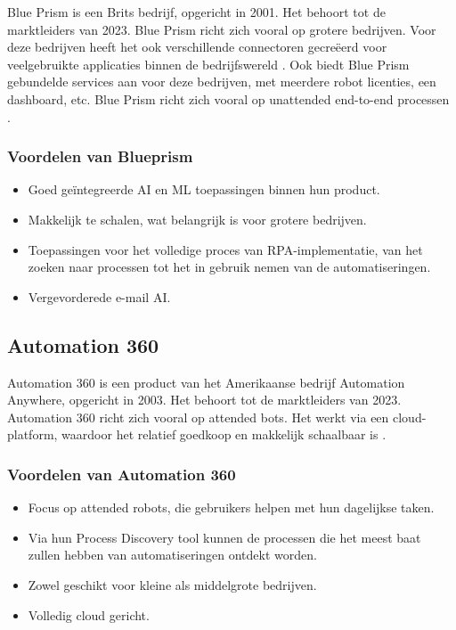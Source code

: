 Blue Prism is een Brits bedrijf, opgericht in 2001. Het behoort tot de marktleiders van 2023. Blue Prism richt zich vooral op grotere bedrijven. Voor deze bedrijven heeft het ook verschillende connectoren gecreëerd voor veelgebruikte applicaties binnen de bedrijfswereld \autocite{GartnerBluePrism2023}. Ook biedt Blue Prism gebundelde services aan voor deze bedrijven, met meerdere robot licenties, een dashboard, etc. Blue Prism richt zich vooral op unattended end-to-end processen \autocite{Laxmikant2023}.

\subsubsection{Voordelen van Blueprism}
\label{subsubsec:voordelen-van-blueprism}

\begin{itemize}
    \item Goed geïntegreerde AI en ML toepassingen binnen hun product.
    \item Makkelijk te schalen, wat belangrijk is voor grotere bedrijven.
    \item Toepassingen voor het volledige proces van RPA-implementatie, van het zoeken naar processen tot het in gebruik nemen van de automatiseringen.
    \item Vergevorderede e-mail AI.
\end{itemize}

\subsection{Automation 360}
\label{subsec:automation-360}

Automation 360 is een product van het Amerikaanse bedrijf Automation Anywhere, opgericht in 2003. Het behoort tot de marktleiders van 2023. Automation 360 richt zich vooral op attended bots. Het werkt via een cloud-platform, waardoor het relatief goedkoop en makkelijk schaalbaar is \autocite{GartnerAutomationAnywhere2023}.

\subsubsection{Voordelen van Automation 360}
\label{subsubsec:voordelen-van-automation-360}

\begin{itemize}
    \item Focus op attended robots, die gebruikers helpen met hun dagelijkse taken.
    \item Via hun Process Discovery tool kunnen de processen die het meest baat zullen hebben van automatiseringen ontdekt worden.
    \item Zowel geschikt voor kleine als middelgrote bedrijven.
    \item Volledig cloud gericht.
\end{itemize}

